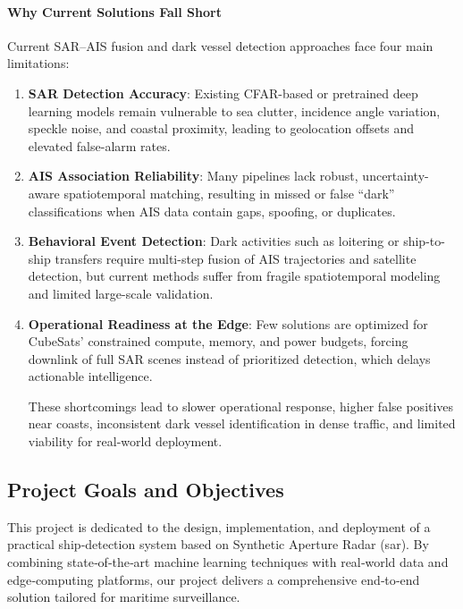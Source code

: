 \documentclass{article}
\begin{document}
	\paragraph{Why Current Solutions Fall Short}
	Current SAR–AIS fusion and dark vessel detection approaches face four main limitations:
	\begin{enumerate}
		\item \textbf{SAR Detection Accuracy}: Existing CFAR-based or pretrained deep learning models remain vulnerable to sea clutter, incidence angle variation, speckle noise, and coastal proximity, leading to geolocation offsets and elevated false-alarm rates.
		\item \textbf{AIS Association Reliability}: Many pipelines lack robust, uncertainty-aware spatiotemporal matching, resulting in missed or false “dark” classifications when AIS data contain gaps, spoofing, or duplicates.
		\item \textbf{Behavioral Event Detection}: Dark activities such as loitering or ship-to-ship transfers require multi-step fusion of AIS trajectories and satellite detection, but current methods suffer from fragile spatiotemporal modeling and limited large-scale validation.
		\item \textbf{Operational Readiness at the Edge}: Few solutions are optimized for CubeSats’ constrained compute, memory, and power budgets, forcing downlink of full SAR scenes instead of prioritized detection, which delays actionable intelligence.
		
		These shortcomings lead to slower operational response, higher false positives near coasts, inconsistent dark vessel identification in dense traffic, and limited viability for real-world deployment.
	\end{enumerate}
	
	
	
	\subsection{Project Goals and Objectives}
	This project is dedicated to the design, implementation, and deployment of a practical ship‑detection system based on Synthetic Aperture Radar (\acrshort{sar}). By combining state‑of‑the‑art machine learning techniques with real‑world data and edge‑computing platforms, our project delivers a comprehensive end‑to‑end solution tailored for maritime surveillance. \\
	
\end{document}
